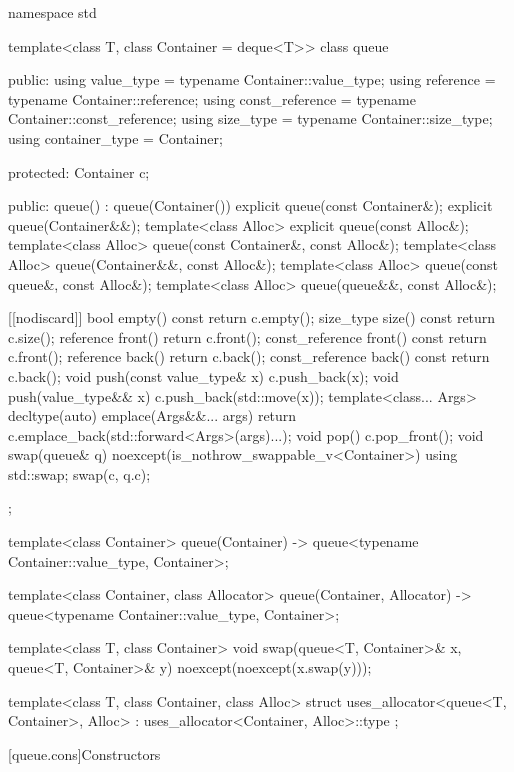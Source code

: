 \begin{codeblock}
namespace std {
  template<class T, class Container = deque<T>>
  class queue {
  public:
    using value_type      = typename Container::value_type;
    using reference       = typename Container::reference;
    using const_reference = typename Container::const_reference;
    using size_type       = typename Container::size_type;
    using container_type  =          Container;

  protected:
    Container c;

  public:
    queue() : queue(Container()) {}
    explicit queue(const Container&);
    explicit queue(Container&&);
    template<class Alloc> explicit queue(const Alloc&);
    template<class Alloc> queue(const Container&, const Alloc&);
    template<class Alloc> queue(Container&&, const Alloc&);
    template<class Alloc> queue(const queue&, const Alloc&);
    template<class Alloc> queue(queue&&, const Alloc&);

    [[nodiscard]] bool empty() const    { return c.empty(); }
    size_type         size()  const     { return c.size(); }
    reference         front()           { return c.front(); }
    const_reference   front() const     { return c.front(); }
    reference         back()            { return c.back(); }
    const_reference   back() const      { return c.back(); }
    void push(const value_type& x)      { c.push_back(x); }
    void push(value_type&& x)           { c.push_back(std::move(x)); }
    template<class... Args>
      decltype(auto) emplace(Args&&... args)
        { return c.emplace_back(std::forward<Args>(args)...); }
    void pop()                          { c.pop_front(); }
    void swap(queue& q) noexcept(is_nothrow_swappable_v<Container>)
      { using std::swap; swap(c, q.c); }
  };

  template<class Container>
    queue(Container) -> queue<typename Container::value_type, Container>;

  template<class Container, class Allocator>
    queue(Container, Allocator) -> queue<typename Container::value_type, Container>;

  template<class T, class Container>
    void swap(queue<T, Container>& x, queue<T, Container>& y) noexcept(noexcept(x.swap(y)));

  template<class T, class Container, class Alloc>
    struct uses_allocator<queue<T, Container>, Alloc>
      : uses_allocator<Container, Alloc>::type { };
}
\end{codeblock}

[queue.cons]{Constructors}

